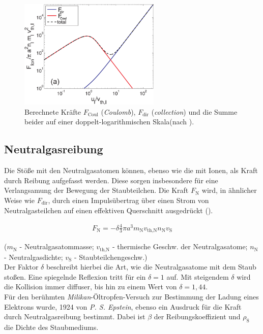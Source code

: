 \documentclass[numbers=noenddot,a4paper,notitlepage,twoside,BCOR15mm]{scrbook}
\newcommand{\ix}[1]{_\text{#1}}
\newcommand{\tilt}[1]{\textit{#1}}
\begin{document}
					\begin{figure}
						\centering
						\includegraphics[height=0.4\textwidth,width=0.6\textwidth]{figs/forcesandtrappingmelzer.png}
						\caption{Berechnete Kräfte $F\ix{Coul}$ (\tilt{Coulomb}), $F\ix{dir}$ (\tilt{collection}) und die Summe beider auf einer doppelt-logarithmischen Skala(nach \cite{Melzer12}).}
						\label{img:ionkräfte}
					\end{figure}

		\subsection{Neutralgasreibung}

			Die Stöße mit den Neutralgasatomen können, ebenso wie die mit Ionen, als Kraft durch Reibung aufgefasst werden. Diese sorgen insbesondere für eine Verlangsamung der Bewegung der Staubteilchen. Die Kraft $F\ix{N}$ wird, in ähnlicher Weise wie $F\ix{dir}$, durch einen Impulsübertrag über einen Strom von Neutralgasteilchen auf einen effektiven Querschnitt ausgedrückt (\cite{Epstein24}).

				\begin{align}
					F\ix{N}=-\delta\frac{4}{3}\pi a^3m\ix{N}v\ix{th,N}n\ix{N}v\ix{S}
				\end{align}

			($m\ix{N}$ - Neutralgasatommasse; $v\ix{th,N}$ - thermische Geschw. der Neutralgasatome; $n\ix{N}$ - Neutralgasdichte; $v\ix{S}$ - Staubteilchengeschw.)\\
			Der Faktor $\delta$ beschreibt hierbei die Art, wie die Neutralgasatome mit dem Staub stoßen. Eine spiegelnde Reflexion tritt für ein $\delta=1$ auf. Mit steigendem $\delta$ wird die Kollision immer diffuser, bis hin zu einem Wert von $\delta=1,44$.\\
			Für den berühmten \tilt{Milikan}-Öltropfen-Versuch zur Bestimmung der Ladung eines Elektrons wurde, 1924 von \tilt{P. S. Epstein}, ebenso ein Ausdruck für die Kraft durch Neutralgasreibung bestimmt. Dabei ist $\beta$ der Reibungskoeffizient und $\rho\ix{S}$ die Dichte des Staubmediums.
\end{document}

